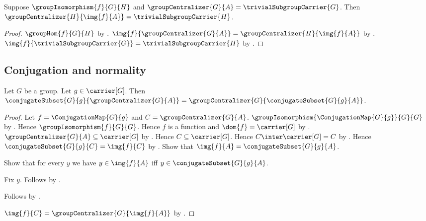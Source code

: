 \begin{corollary}\label{group_isomorphism_trivial_centralizer_image}
    Suppose $\groupIsomorphism{f}{G}{H}$ and
        $\groupCentralizer{G}{A}=\trivialSubgroupCarrier{G}$.
    Then
        $\groupCentralizer{H}{\img{f}{A}}=
            \trivialSubgroupCarrier{H}$.
\end{corollary}
\begin{proof}
    $\groupHom{f}{G}{H}$ by .
    $\img{f}{\groupCentralizer{G}{A}}=
        \groupCentralizer{H}{\img{f}{A}}$ by
        .
    $\img{f}{\trivialSubgroupCarrier{G}}=
        \trivialSubgroupCarrier{H}$ by
        .
\end{proof}

\subsection{Conjugation and normality}

\begin{theorem}\label{group_centralizer_conjugate}
    Let $G$ be a group.
    Let $g\in\carrier[G]$.
    Then
        $\conjugateSubset{G}{g}{\groupCentralizer{G}{A}}=
        \groupCentralizer{G}{\conjugateSubset{G}{g}{A}}$.
\end{theorem}
\begin{proof}
    Let $f=\ConjugationMap{G}{g}$ and
        $C=\groupCentralizer{G}{A}$.
    $\groupIsomorphism{\ConjugationMap{G}{g}}{G}{G}$ by
        .
    Hence $\groupIsomorphism{f}{G}{G}$.
    Hence $f$ is a function and $\dom{f}=\carrier[G]$ by
        .
    $\groupCentralizer{G}{A}\subseteq\carrier[G]$ by
        .
    Hence $C\subseteq\carrier[G]$.
    Hence $C\inter\carrier[G]=C$ by
        .
    Hence $\conjugateSubset{G}{g}{C}=\img{f}{C}$ by
        .
    Show that $\img{f}{A}=\conjugateSubset{G}{g}{A}$.
    \begin{subproof}
        Show that for every $y$ we have
            $y\in\img{f}{A}$ iff
            $y\in\conjugateSubset{G}{g}{A}$.
        \begin{subproof}
            Fix $y$.
            Follows by
                .
        \end{subproof}
        Follows by .
    \end{subproof}
    $\img{f}{C}=\groupCentralizer{G}{\img{f}{A}}$ by
        .
\end{proof}

